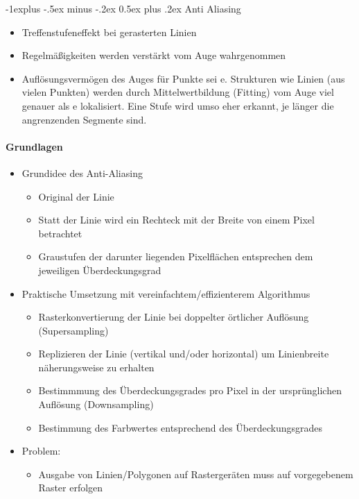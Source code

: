 \documentclass[10pt,landscape]{article}
\makeatletter
\renewcommand{\subsection}{\@startsection{subsection}{2}{0mm}%
                                {-1explus -.5ex minus -.2ex}%
                                {0.5ex plus .2ex}%
                                {\normalfont\normalsize\bfseries}}
\makeatother
\begin{document}
\begin{multicols}{3}
  \subsection{Anti Aliasing}
  \begin{itemize}
    \item Treffenstufeneffekt bei gerasterten Linien
    \item Regelmäßigkeiten werden verstärkt vom Auge wahrgenommen
    \item Auflösungsvermögen des Auges für Punkte sei e. Strukturen wie Linien (aus vielen Punkten) werden durch Mittelwertbildung (Fitting) vom Auge viel genauer als e lokalisiert. Eine Stufe wird umso eher erkannt, je länger die angrenzenden Segmente sind.
  \end{itemize}
  
  \paragraph{Grundlagen}
  \begin{itemize}
    \item Grundidee des Anti-Aliasing
          \begin{itemize}
            \item Original der Linie
            \item Statt der Linie wird ein Rechteck mit der Breite von einem Pixel betrachtet
            \item Graustufen der darunter liegenden Pixelflächen entsprechen dem jeweiligen Überdeckungsgrad
          \end{itemize}
    \item Praktische Umsetzung mit vereinfachtem/effizienterem Algorithmus
          \begin{itemize}
            \item Rasterkonvertierung der Linie bei doppelter örtlicher Auflösung (Supersampling)
            \item Replizieren der Linie (vertikal und/oder horizontal) um Linienbreite näherungsweise zu erhalten
            \item Bestimmmung des Überdeckungsgrades pro Pixel in der ursprünglichen Auflösung (Downsampling)
            \item Bestimmung des Farbwertes entsprechend des Überdeckungsgrades
          \end{itemize}
    \item Problem:
          \begin{itemize}
            \item Ausgabe von Linien/Polygonen auf Rastergeräten muss auf vorgegebenem Raster erfolgen

\end{itemize}
\end{itemize}
\end{multicols}
\end{document}
